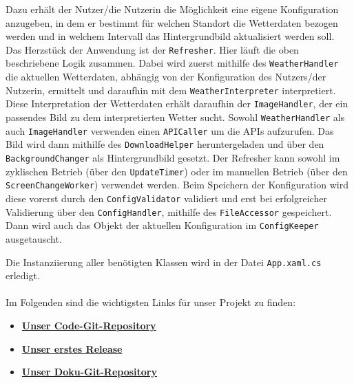 Dazu erhält der Nutzer/die Nutzerin die Möglichkeit eine eigene Konfiguration anzugeben, in dem er bestimmt für welchen Standort die Wetterdaten bezogen werden und in welchem Intervall das Hintergrundbild aktualisiert werden soll. Das Herzstück der Anwendung ist der \texttt{Refresher}. Hier läuft die oben beschriebene Logik zusammen. Dabei wird zuerst mithilfe des \texttt{WeatherHandler} die aktuellen Wetterdaten, abhängig von der Konfiguration des Nutzers/der Nutzerin, ermittelt und daraufhin mit dem \texttt{WeatherInterpreter} interpretiert. Diese Interpretation der Wetterdaten erhält daraufhin der \texttt{ImageHandler}, der ein passendes Bild zu dem interpretierten Wetter sucht. Sowohl \texttt{WeatherHandler} als auch \texttt{ImageHandler} verwenden einen \texttt{APICaller} um die APIs aufzurufen. Das Bild wird dann mithilfe des \texttt{DownloadHelper} heruntergeladen und über den \texttt{BackgroundChanger} als Hintergrundbild gesetzt. Der Refresher kann sowohl im zyklischen Betrieb (über den \texttt{UpdateTimer}) oder im manuellen Betrieb (über den \texttt{ScreenChangeWorker}) verwendet werden. Beim Speichern der Konfiguration wird diese vorerst durch den \texttt{ConfigValidator} validiert und erst bei erfolgreicher Validierung über den \texttt{ConfigHandler}, mithilfe des \texttt{FileAccessor} gespeichert. Dann wird auch das Objekt der aktuellen Konfiguration im \texttt{ConfigKeeper} ausgetauscht.

Die Instanziierung aller benötigten Klassen wird in der Datei \texttt{App.xaml.cs} erledigt.\\
\\
Im Folgenden sind die wichtigsten Links für unser Projekt zu finden:
\begin{itemize}
\item \href{https://github.com/Bronzila/WeatherWallpaper}{\color{blue} \textbf{Unser Code-Git-Repository}}
\item \href{https://github.com/Bronzila/WeatherWallpaper/releases/tag/V1}{\color{blue} \textbf{Unser erstes Release}}
\item \href{https://github.com/gierle/WeatherWallpaperDocumentation}{\color{blue} \textbf{Unser Doku-Git-Repository}}
\end{itemize}